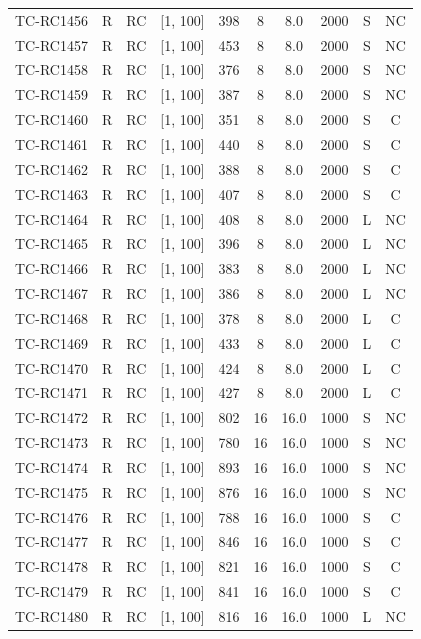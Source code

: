 \begin{longtable}{lccccccccc}
TC-RC1456 & R & RC & [1, 100] & 398 & 8 & 8.0 & 2000 & S & NC \\
TC-RC1457 & R & RC & [1, 100] & 453 & 8 & 8.0 & 2000 & S & NC \\
TC-RC1458 & R & RC & [1, 100] & 376 & 8 & 8.0 & 2000 & S & NC \\
TC-RC1459 & R & RC & [1, 100] & 387 & 8 & 8.0 & 2000 & S & NC \\
TC-RC1460 & R & RC & [1, 100] & 351 & 8 & 8.0 & 2000 & S & C \\
TC-RC1461 & R & RC & [1, 100] & 440 & 8 & 8.0 & 2000 & S & C \\
TC-RC1462 & R & RC & [1, 100] & 388 & 8 & 8.0 & 2000 & S & C \\
TC-RC1463 & R & RC & [1, 100] & 407 & 8 & 8.0 & 2000 & S & C \\
TC-RC1464 & R & RC & [1, 100] & 408 & 8 & 8.0 & 2000 & L & NC \\
TC-RC1465 & R & RC & [1, 100] & 396 & 8 & 8.0 & 2000 & L & NC \\
TC-RC1466 & R & RC & [1, 100] & 383 & 8 & 8.0 & 2000 & L & NC \\
TC-RC1467 & R & RC & [1, 100] & 386 & 8 & 8.0 & 2000 & L & NC \\
TC-RC1468 & R & RC & [1, 100] & 378 & 8 & 8.0 & 2000 & L & C \\
TC-RC1469 & R & RC & [1, 100] & 433 & 8 & 8.0 & 2000 & L & C \\
TC-RC1470 & R & RC & [1, 100] & 424 & 8 & 8.0 & 2000 & L & C \\
TC-RC1471 & R & RC & [1, 100] & 427 & 8 & 8.0 & 2000 & L & C \\
TC-RC1472 & R & RC & [1, 100] & 802 & 16 & 16.0 & 1000 & S & NC \\
TC-RC1473 & R & RC & [1, 100] & 780 & 16 & 16.0 & 1000 & S & NC \\
TC-RC1474 & R & RC & [1, 100] & 893 & 16 & 16.0 & 1000 & S & NC \\
TC-RC1475 & R & RC & [1, 100] & 876 & 16 & 16.0 & 1000 & S & NC \\
TC-RC1476 & R & RC & [1, 100] & 788 & 16 & 16.0 & 1000 & S & C \\
TC-RC1477 & R & RC & [1, 100] & 846 & 16 & 16.0 & 1000 & S & C \\
TC-RC1478 & R & RC & [1, 100] & 821 & 16 & 16.0 & 1000 & S & C \\
TC-RC1479 & R & RC & [1, 100] & 841 & 16 & 16.0 & 1000 & S & C \\
TC-RC1480 & R & RC & [1, 100] & 816 & 16 & 16.0 & 1000 & L & NC \\

\end{longtable}
